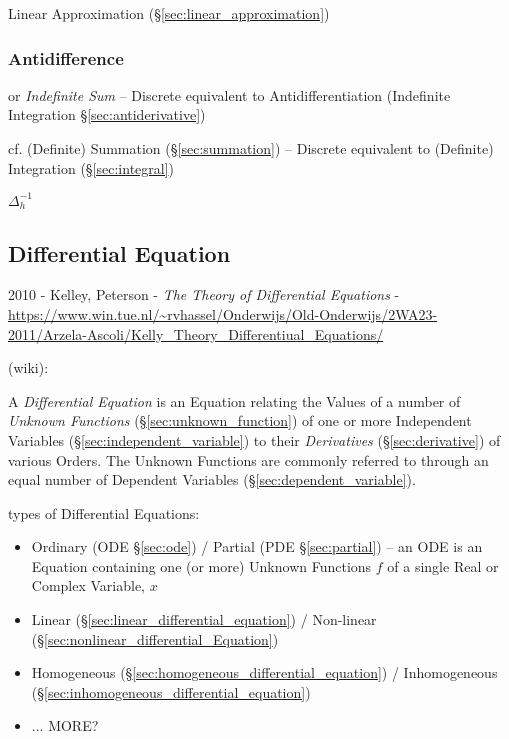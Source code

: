 Linear Approximation (\S\ref{sec:linear_approximation})



\subsubsection{Antidifference}\label{sec:antidifference}

or \emph{Indefinite Sum} -- Discrete equivalent to Antidifferentiation
(Indefinite Integration \S\ref{sec:antiderivative})

cf. (Definite) Summation (\S\ref{sec:summation}) -- Discrete equivalent to
(Definite) Integration (\S\ref{sec:integral})

$\Delta^{-1}_h$



\subsection{Differential Equation}\label{sec:differential_equation}

2010 - Kelley, Peterson - \emph{The Theory of Differential Equations} -
\url{https://www.win.tue.nl/~rvhassel/Onderwijs/Old-Onderwijs/2WA23-2011/Arzela-Ascoli/Kelly_Theory_Differentiual_Equations/}

(wiki):

A \emph{Differential Equation} is an Equation relating the Values of a number of
\emph{Unknown Functions} (\S\ref{sec:unknown_function}) of one or more
Independent Variables (\S\ref{sec:independent_variable}) to their
\emph{Derivatives} (\S\ref{sec:derivative}) of various Orders. The Unknown
Functions are commonly referred to through an equal number of Dependent
Variables (\S\ref{sec:dependent_variable}).

types of Differential Equations:
\begin{itemize}
  \item Ordinary (ODE \S\ref{sec:ode}) / Partial (PDE \S\ref{sec:partial}) --
    an ODE is an Equation containing one (or more) Unknown Functions $f$ of a
    single Real or Complex Variable, $x$
  \item Linear (\S\ref{sec:linear_differential_equation}) /
    Non-linear (\S\ref{sec:nonlinear_differential_Equation})
  \item Homogeneous (\S\ref{sec:homogeneous_differential_equation}) /
    Inhomogeneous (\S\ref{sec:inhomogeneous_differential_equation})
  \item ... MORE?
\end{itemize}

